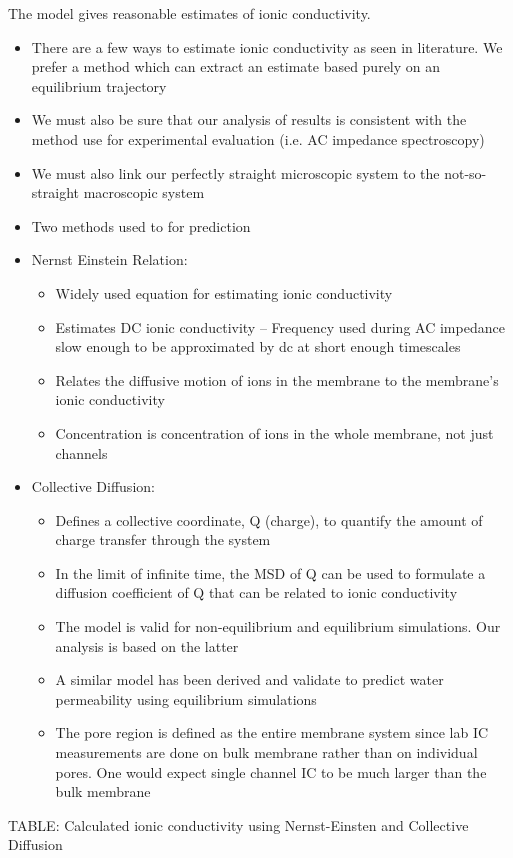 \documentclass{article}
\begin{document}
	The model gives reasonable estimates of ionic conductivity.
	\begin{itemize}
		\item There are a few ways to estimate ionic conductivity as seen in literature. We prefer a method which can extract an estimate based purely on an equilibrium trajectory
		\item We must also be sure that our analysis of results is consistent with the method use for experimental evaluation (i.e. AC impedance spectroscopy)
		\item We must also link our perfectly straight microscopic system to the not-so-straight macroscopic system
		\item Two methods used to for prediction
		\item Nernst Einstein Relation:
		\begin{itemize}
			\item Widely used equation for estimating ionic conductivity
			\item Estimates DC ionic conductivity -- Frequency used during AC impedance slow enough to be approximated by dc at short enough timescales
			\item Relates the diffusive motion of ions in the membrane to the membrane's ionic conductivity
			\item Concentration is concentration of ions in the whole membrane, not just channels
		\end{itemize}
		\item Collective Diffusion:
		\begin{itemize}
			\item Defines a collective coordinate, Q (charge), to quantify the amount of charge transfer through the system
			\item In the limit of infinite time, the MSD of Q can be used to formulate a diffusion coefficient of Q that can be related to ionic conductivity
			\item The model is valid for non-equilibrium and equilibrium simulations. Our analysis is based on the latter
			\item A similar model has been derived and validate to predict water permeability using equilibrium simulations
			\item The pore region is defined as the entire membrane system since lab IC measurements are done on bulk membrane rather than on individual pores. One would expect single channel IC to be much larger than the bulk membrane
                \end{itemize}                    
	\end{itemize}
	TABLE: Calculated ionic conductivity using Nernst-Einsten and Collective Diffusion
\end{document}
